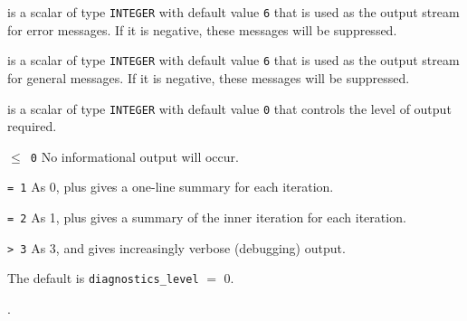 \documentclass{spec}
\begin{document}
\begin{description}

 is a scalar of type {\tt INTEGER} with default value {\tt 6} that
is used as the output stream for error messages. If it is negative, these
messages will be suppressed.  

 is a scalar of type {\tt INTEGER} with default value {\tt 6}
that is used as the output stream for general messages. If it is negative, these messages will be suppressed. 

 is a scalar of type {\tt INTEGER} with default value {\tt 0} that 
controls the level of output required. 
\begin{description} 
\item{\tt $\leq$ 0} No informational output will occur.
\item{\tt = 1} As 0, plus gives a one-line summary for each iteration.
\item{\tt = 2} As 1, plus gives a summary of the inner iteration for each iteration.
\item{\tt > 3} As 3, and gives increasingly verbose (debugging) output.
\end{description}
The default is {\tt diagnostics\_level} $=$ 0.
\end{description}

.
\end{document}
